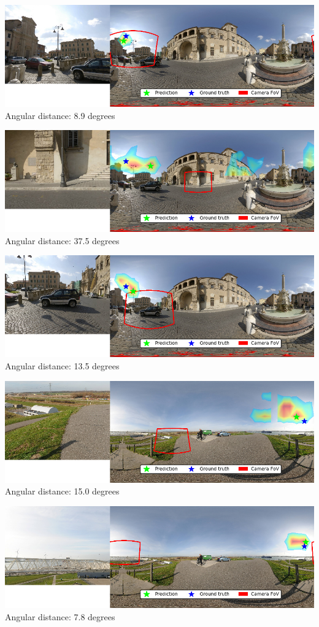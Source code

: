 \begin{multicols}{2}
\includegraphics[width=\mywidth]{pano_aakpbaojeqowkb_006.jpg}\\
Angular distance: 8.9 degrees

\includegraphics[width=\mywidth]{pano_aakpbaojeqowkb_004.jpg}\\
Angular distance: 37.5 degrees

\includegraphics[width=\mywidth]{pano_aakpbaojeqowkb_003.jpg}\\
Angular distance: 13.5 degrees

\includegraphics[width=\mywidth]{pano_aaqezlelvvcrrh_005.jpg}\\
Angular distance: 15.0 degrees

\includegraphics[width=\mywidth]{pano_aaqezlelvvcrrh_002.jpg}\\
Angular distance: 7.8 degrees


\end{multicols}
